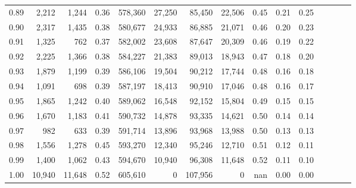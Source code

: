 \begin{tabular}{rrrcrrrrrrrrrrr}
0.89 &   2,212 &   1,244 &                                       0.36 &  578,360 &   27,250 &   85,450 &   22,506 &  0.45 &  0.21 &                         0.25 \\
0.90 &   2,317 &   1,435 &                                       0.38 &  580,677 &   24,933 &   86,885 &   21,071 &  0.46 &  0.20 &                         0.23 \\
0.91 &   1,325 &     762 &                                       0.37 &  582,002 &   23,608 &   87,647 &   20,309 &  0.46 &  0.19 &                         0.22 \\
0.92 &   2,225 &   1,366 &                                       0.38 &  584,227 &   21,383 &   89,013 &   18,943 &  0.47 &  0.18 &                         0.20 \\
0.93 &   1,879 &   1,199 &                                       0.39 &  586,106 &   19,504 &   90,212 &   17,744 &  0.48 &  0.16 &                         0.18 \\
0.94 &   1,091 &     698 &                                       0.39 &  587,197 &   18,413 &   90,910 &   17,046 &  0.48 &  0.16 &                         0.17 \\
0.95 &   1,865 &   1,242 &                                       0.40 &  589,062 &   16,548 &   92,152 &   15,804 &  0.49 &  0.15 &                         0.15 \\
0.96 &   1,670 &   1,183 &                                       0.41 &  590,732 &   14,878 &   93,335 &   14,621 &  0.50 &  0.14 &                         0.14 \\
0.97 &     982 &     633 &                                       0.39 &  591,714 &   13,896 &   93,968 &   13,988 &  0.50 &  0.13 &                         0.13 \\
0.98 &   1,556 &   1,278 &                                       0.45 &  593,270 &   12,340 &   95,246 &   12,710 &  0.51 &  0.12 &                         0.11 \\
0.99 &   1,400 &   1,062 &                                       0.43 &  594,670 &   10,940 &   96,308 &   11,648 &  0.52 &  0.11 &                         0.10 \\
1.00 &  10,940 &  11,648 &                                       0.52 &  605,610 &        0 &  107,956 &        0 &   nan &  0.00 &                         0.00 \\
\bottomrule
\end{tabular}
